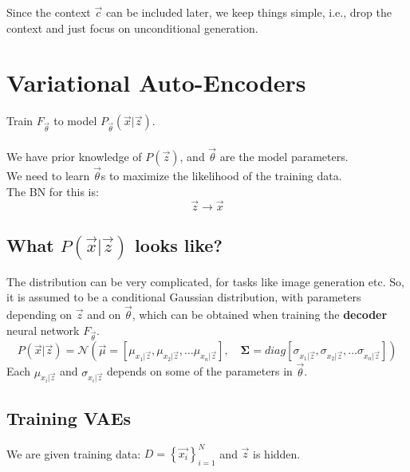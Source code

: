 \documentclass[a4paper]{article}
\begin{document}
Since the context $\vec{c}$ can be included later, we keep things simple, i.e., drop the context and just focus on unconditional generation.

\section{Variational Auto-Encoders}
Train $F_{\vec{\theta}}$ to model $P_{\vec{\theta}}(\vec{x} | \vec{z}) $. \\ \\
We have prior knowledge of $P(\vec{z})$, and $\vec{\theta}$ are the model parameters. \\
We need to learn $\vec{\theta}$s to maximize the likelihood of the training data. \\
The BN for this is:
$$
    \vec{z} \longrightarrow \vec{x}
$$

\subsection{What $P(\vec{x} | \vec{z})$ looks like?}
The distribution can be very complicated, for tasks like image generation etc. So, it is assumed to be a conditional Gaussian distribution, with parameters depending on $\vec{z}$ and on $\vec{\theta}$, which can be obtained when training the \textbf{decoder} neural network $F_{\vec{\theta}}$.
\[
P(\vec{x} | \vec{z}) = \mathcal{N}\left( \vec{\mu} = [ \mu_{x_1|\vec{z}}, \mu_{x_2|\vec{z}}, \dots \mu_{x_n|\vec{z}} ], \quad \mathbf{\Sigma} =  diag[\sigma_{x_1|\vec{z}}, \sigma_{x_2|\vec{z}}, \dots \sigma_{x_n|\vec{z}}] \right)
\]
Each $\mu_{x_i|\vec{z}}$ and $\sigma_{x_i|\vec{z}}$ depends on some of the parameters in $\vec{\theta}$.

\subsection{Training VAEs}
We are given training data:
\(
    D = \left\{\vec{x_i}\right\}_{i=1}^N
\)
and $\vec{z}$ is hidden.
\end{document}
